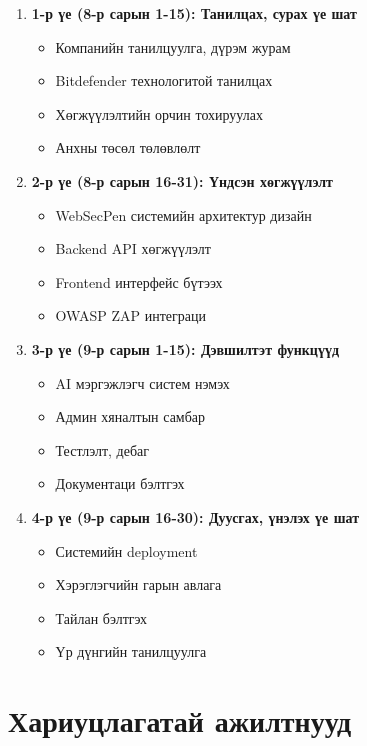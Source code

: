 \documentclass[main.tex]{subfiles}
\begin{document}
\begin{enumerate}
    \item \textbf{1-р үе (8-р сарын 1-15): Танилцах, сурах үе шат}
    \begin{itemize}
        \item Компанийн танилцуулга, дүрэм журам
        \item Bitdefender технологитой танилцах
        \item Хөгжүүлэлтийн орчин тохируулах
        \item Анхны төсөл төлөвлөлт
    \end{itemize}
    
    \item \textbf{2-р үе (8-р сарын 16-31): Үндсэн хөгжүүлэлт}
    \begin{itemize}
        \item WebSecPen системийн архитектур дизайн
        \item Backend API хөгжүүлэлт
        \item Frontend интерфейс бүтээх
        \item OWASP ZAP интеграци
    \end{itemize}
    
    \item \textbf{3-р үе (9-р сарын 1-15): Дэвшилтэт функцүүд}
    \begin{itemize}
        \item AI мэргэжлэгч систем нэмэх
        \item Админ хяналтын самбар
        \item Тестлэлт, дебаг
        \item Документаци бэлтгэх
    \end{itemize}
    
    \item \textbf{4-р үе (9-р сарын 16-30): Дуусгах, үнэлэх үе шат}
    \begin{itemize}
        \item Системийн deployment
        \item Хэрэглэгчийн гарын авлага
        \item Тайлан бэлтгэх
        \item Үр дүнгийн танилцуулга
    \end{itemize}
\end{enumerate}

\section{Хариуцлагатай ажилтнууд}
\end{document}
